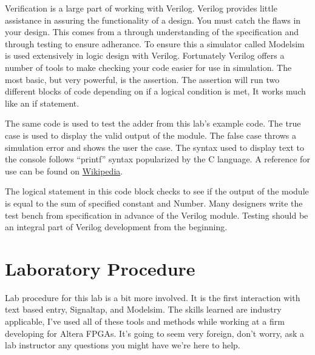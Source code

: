       Verification is a large part of working with Verilog. Verilog provides little assistance in assuring the functionality of a design. You must catch the flaws in your design. This comes from a through understanding of the specification and through testing to ensure adherance. To ensure this a simulator called Modelsim is used extensively in logic design with Verilog. Fortunately Verilog offers a number of tools to make checking your code easier for use in simulation. The most basic, but very powerful, is the assertion. The assertion will run two different blocks of code depending on if a logical condition is met, It works much like an if statement.
      

      The same code is used to test the adder from this lab's example code. The true case is used to display the valid output of the module. The false case throws a simulation error and shows the user the case. The syntax used to display text to the console follows ``printf'' syntax popularized by the C language. A reference for use can be found on \href{https://en.wikipedia.org/wiki/Printf_format_string}{Wikipedia}.
      

      The logical statement in this code block checks to see if the output of the module is equal to the sum of specified constant and Number. Many designers write the test bench from specification in advance of the Verilog module. Testing should be an integral part of Verilog development from the beginning.


  \section{Laboratory Procedure}
     Lab procedure for this lab is a bit more involved. It is the first interaction with text based entry, Signaltap, and Modelsim. The skills learned are industry applicable, I've used all of these tools and methods while working at a firm developing for Altera FPGAs. It's going to seem very foreign, don't worry, ask a lab instructor any questions you might have we're here to help.

